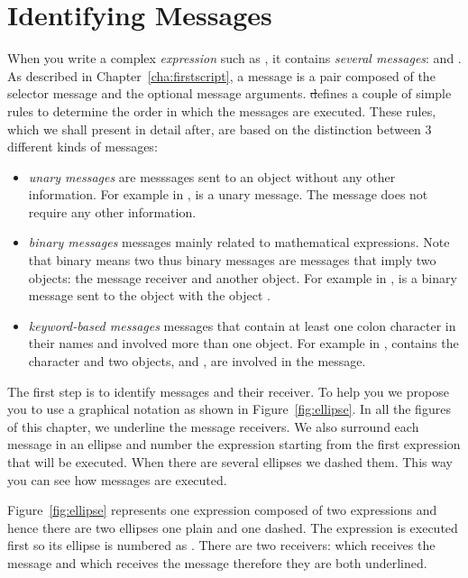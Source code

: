 \section{Identifying Messages}

When you write a complex \emph{expression} such  as , it contains \emph{several messages}:  and \ct{+}. As described in Chapter~\ref{cha:firstscript},  a message is a pair composed of the selector message and the optional message arguments. \st defines a couple of simple rules to determine the order in which the messages are executed. These rules, which we shall present in detail after, are based on the distinction between 3 different kinds of messages: 

\begin{itemize}
\item {}\textit{unary messages} are messsages sent to an object without any other information. For example in ,  is a unary message. The message  does not require any other information.

\item  {}\textit{binary messages} \ie messages mainly related to mathematical expressions. Note that binary means two thus binary messages are messages that imply two objects: the message receiver and another object. For example in , \ct{+} is a binary message sent to the object  with the object . 

\item  {} \textit{keyword-based messages} \ie messages that contain at least one colon character \ct{:} in their names and involved more than one object. For example in ,  contains the character \ct{:} and two objects, \caro and , are involved in the message. 
 \end{itemize}
 
The first step is to identify messages and their receiver. To help you we propose you to use a graphical notation as shown in Figure~\ref{fig:ellipse}. In all the figures of this chapter, we underline the message receivers. We also surround each message in an ellipse and number the expression starting from the first expression that will be executed. When there are several ellipses we dashed them. This way you can see how messages are executed.

Figure~\ref{fig:ellipse} represents one expression composed of two expressions  and  hence there are two ellipses one plain and one dashed. The expression  is executed first so its ellipse is numbered as .  There are two receivers: \ct{\caro} which receives the message  and  which receives the message  therefore they are both underlined.

